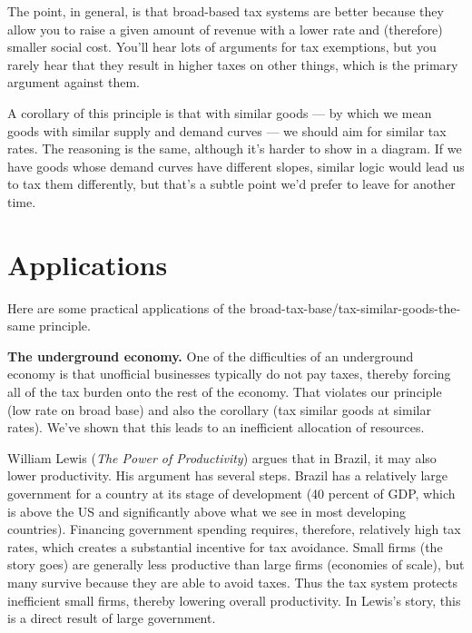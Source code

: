 The point, in general, is that broad-based tax systems are better
because they allow you to raise a given amount of revenue with
a lower rate and (therefore) smaller social cost.
You'll hear lots of arguments for tax exemptions,
but you rarely hear that they result in higher taxes on other things,
which is the primary argument against them.

A corollary of this principle is that with similar goods ---
by which we mean goods with similar supply and demand curves --- we should aim for similar tax rates.
The reasoning is the same,
although it's harder to show in a diagram.
If we have goods whose demand curves have different slopes,
similar logic would lead us to tax them differently,
but that's a subtle point we'd prefer to leave for another time.



\section{Applications}

Here are some practical applications
of the broad-tax-base/tax-similar-goods-the-same principle.

\textbf{The underground economy.}
One of the difficulties of an underground economy is that
unofficial businesses typically do not pay taxes,
thereby forcing all of the tax burden onto the rest
of the economy.
That violates our principle (low rate on broad base) and also
the corollary (tax similar goods at similar rates).
We've shown that this leads to an inefficient allocation of resources.


William Lewis ({\it The Power of Productivity\/}) argues that in
Brazil, it may also lower productivity.
His argument has several steps.
Brazil has a relatively large government
for a country at its stage of development (40 percent of GDP, which
is above the US
and significantly above what we see in most developing countries).
Financing government spending requires, therefore,
relatively high tax rates,
which creates a substantial incentive for tax avoidance.
Small firms (the story goes) are generally less productive than large firms
(economies of scale),
but many survive because they are able to avoid taxes.
Thus the tax system protects inefficient small firms,
thereby lowering overall productivity.
In Lewis's story, this is a direct result of large government.



